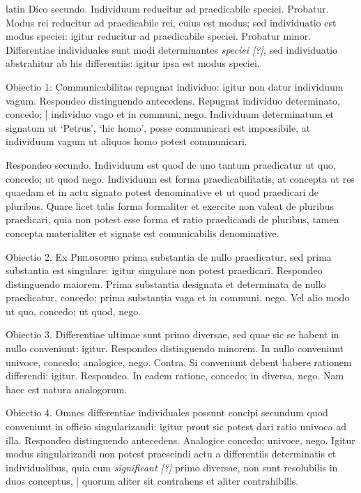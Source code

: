 \begin{otherlanguage*}{latin}
\pstart
Dico secundo. Individuum reducitur ad praedicabile speciei. Probatur. Modus rei reducitur ad praedicabile rei, cuius est modus; sed individuatio est modus speciei:
igitur reducitur ad praedicabile speciei. Probatur minor. Differentiae individuales sunt modi determinantes \emph{speciei [?]}, sed individuatio abstrahitur ab his differentiis:
igitur ipsa est modus speciei. 
\pend

\pstart
Obiectio 1:
Communicabilitas repugnat individuo:
igitur non datur individuum vagum. Respondeo distinguendo antecedens. Repugnat individuo determinato, concedo; \textnormal{|} individuo vago et in communi, nego. Individuum determinatum et signatum ut `Petrus', `hic homo', posse communicari est impossibile, at individuum vagum ut aliquos homo potest communicari. 
\pend

\pstart
Respondeo secundo. Individuum est quod de uno tantum praedicatur ut quo, concedo; ut quod nego. Individuum est forma praedicabilitatis, at concepta ut res quaedam et in actu signato potest denominative et ut quod praedicari de pluribus. Quare licet talis forma formaliter et exercite non valeat de pluribus praedicari, quia non potest esse forma et ratio praedicandi de pluribus, tamen concepta materialiter et signate est comunicabilis denominative. 
\pend

\pstart
Obiectio 2. Ex \textsc{Philosopho} prima substantia de nullo praedicatur, sed prima substantia est singulare:
igitur singulare non potest praedicari. Respondeo distinguendo maiorem. Prima substantia designata et determinata de nullo praedicatur, concedo; prima substantia vaga et in communi, nego. Vel alio modo ut quo, concedo; ut quod, nego. 
\pend

\pstart
Obiectio 3. Differentiae ultimae sunt primo diversae, sed quae sic se habent in nullo conveniunt:
igitur. Respondeo distinguendo minorem. In nullo conveniunt univoce, concedo; analogice, nego. Contra. Si conveniunt debent habere rationem differendi:
igitur. Respondeo. In eadem ratione, concedo; in diversa, nego. Nam haec est natura analogorum. 
\pend

\pstart
Obiectio 4. Omnes differentiae individuales possunt concipi secundum quod conveniunt in officio singularizandi:
igitur prout sic potest dari ratio univoca ad illa. Respondeo distinguendo antecedens. Analogice concedo; univoce, nego. Igitur modus singularizandi non potest praescindi actu a differentiis determinatis et individualibus, quia cum \emph{significant [?]} primo diversae, non sunt resolubilis in duos conceptus, \textnormal{|} quorum aliter sit contrahens et aliter contrahibilis. 
\pend


\end{otherlanguage*}
